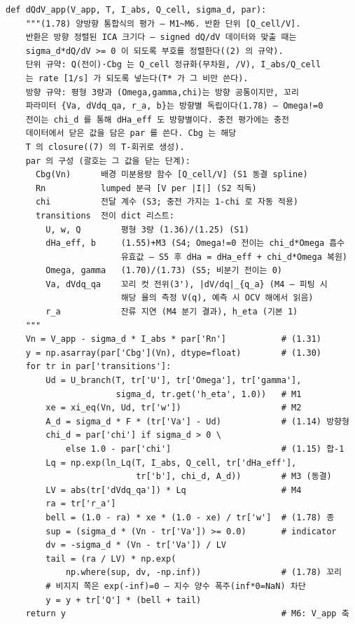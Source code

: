 \documentclass[11pt,a4paper]{article}
\begin{document}
\begin{footnotesize}
\begin{verbatim}
def dQdV_app(V_app, T, I_abs, Q_cell, sigma_d, par):
    """(1.78) 양방향 통합식의 평가 — M1~M6. 반환 단위 [Q_cell/V].
    반환은 방향 정렬된 ICA 크기다 — signed dQ/dV 데이터와 맞출 때는
    sigma_d*dQ/dV >= 0 이 되도록 부호를 정렬한다((2) 의 규약).
    단위 규약: Q(전이)·Cbg 는 Q_cell 정규화(무차원, /V), I_abs/Q_cell
    는 rate [1/s] 가 되도록 넣는다(T* 가 그 비만 쓴다).
    방향 규약: 평형 3량과 (Omega,gamma,chi)는 방향 공통이지만, 꼬리
    파라미터 {Va, dVdq_qa, r_a, b}는 방향별 독립이다(1.78) — Omega!=0
    전이는 chi_d 를 통해 dHa_eff 도 방향별이다. 충전 평가에는 충전
    데이터에서 닫은 값을 담은 par 를 쓴다. Cbg 는 해당
    T 의 closure((7) 의 T-회귀로 생성).
    par 의 구성 (괄호는 그 값을 닫는 단계):
      Cbg(Vn)      배경 미분용량 함수 [Q_cell/V] (S1 동결 spline)
      Rn           lumped 분극 [V per |I|] (S2 직독)
      chi          전달 계수 (S3; 충전 가지는 1-chi 로 자동 적용)
      transitions  전이 dict 리스트:
        U, w, Q        평형 3량 (1.36)/(1.25) (S1)
        dHa_eff, b     (1.55)+M3 (S4; Omega!=0 전이는 chi_d*Omega 흡수
                       유효값 — S5 후 dHa = dHa_eff + chi_d*Omega 복원)
        Omega, gamma   (1.70)/(1.73) (S5; 비분기 전이는 0)
        Va, dVdq_qa    꼬리 컷 전위(3'), |dV/dq|_{q_a} (M4 — 피팅 시
                       해당 율의 측정 V(q), 예측 시 OCV 해에서 읽음)
        r_a            잔류 지연 (M4 분기 결과), h_eta (기본 1)
    """
    Vn = V_app - sigma_d * I_abs * par['Rn']           # (1.31)
    y = np.asarray(par['Cbg'](Vn), dtype=float)        # (1.30)
    for tr in par['transitions']:
        Ud = U_branch(T, tr['U'], tr['Omega'], tr['gamma'],
                      sigma_d, tr.get('h_eta', 1.0))   # M1
        xe = xi_eq(Vn, Ud, tr['w'])                    # M2
        A_d = sigma_d * F * (tr['Va'] - Ud)            # (1.14) 방향형
        chi_d = par['chi'] if sigma_d > 0 \
            else 1.0 - par['chi']                      # (1.15) 합-1
        Lq = np.exp(ln_Lq(T, I_abs, Q_cell, tr['dHa_eff'],
                          tr['b'], chi_d, A_d))        # M3 (동결)
        LV = abs(tr['dVdq_qa']) * Lq                   # M4
        ra = tr['r_a']
        bell = (1.0 - ra) * xe * (1.0 - xe) / tr['w']  # (1.78) 종
        sup = (sigma_d * (Vn - tr['Va']) >= 0.0)       # indicator
        dv = -sigma_d * (Vn - tr['Va']) / LV
        tail = (ra / LV) * np.exp(
            np.where(sup, dv, -np.inf))                # (1.78) 꼬리
        # 비지지 쪽은 exp(-inf)=0 — 지수 양수 폭주(inf*0=NaN) 차단
        y = y + tr['Q'] * (bell + tail)
    return y                                           # M6: V_app 축
\end{verbatim}
\end{footnotesize}
\end{document}
